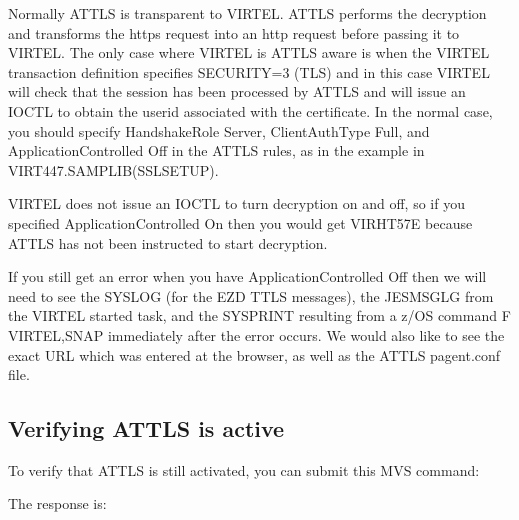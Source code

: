 \documentclass[letterpaper,10pt,english]{sphinxmanual}
\begin{document}
\sphinxAtStartPar
Normally AT\sphinxhyphen{}TLS is transparent to VIRTEL. AT\sphinxhyphen{}TLS performs the decryption and transforms the https request into an http request before passing it to VIRTEL. The only case where VIRTEL is AT\sphinxhyphen{}TLS aware is when the VIRTEL transaction definition specifies SECURITY=3 (TLS) and in this case VIRTEL will check that the session has been processed by AT\sphinxhyphen{}TLS and will issue an IOCTL to obtain the userid associated with the certificate. In the normal case, you should specify HandshakeRole Server, ClientAuthType Full, and ApplicationControlled Off in the AT\sphinxhyphen{}TLS rules, as in the example in VIRT447.SAMPLIB(SSLSETUP).

\sphinxAtStartPar
VIRTEL does not issue an IOCTL to turn decryption on and off, so if you specified ApplicationControlled On then you would get VIRHT57E because AT\sphinxhyphen{}TLS has not been instructed to start decryption.

\sphinxAtStartPar
If you still get an error when you have ApplicationControlled Off then we will need to see the SYSLOG (for the EZD TTLS messages), the JESMSGLG from the VIRTEL started task, and the SYSPRINT resulting from a z/OS command F VIRTEL,SNAP immediately after the error occurs. We would also like to see the exact URL which was entered at the browser, as well as the AT\sphinxhyphen{}TLS pagent.conf file.


\subsection{Verifying AT\sphinxhyphen{}TLS is active}
\label{\detokenize{connectivity_guide:verifying-at-tls-is-active}}
\sphinxAtStartPar
To verify that AT\sphinxhyphen{}TLS is still activated, you can submit this MVS command:

\begin{sphinxVerbatim}[commandchars=\\\{\}]
 
\end{sphinxVerbatim}

\sphinxAtStartPar
The response is:

\begin{sphinxVerbatim}[commandchars=\\\{\}]
                     
\end{sphinxVerbatim}
\end{document}
